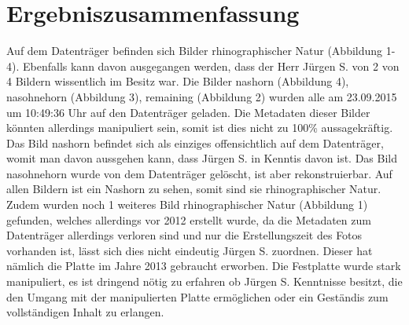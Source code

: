 \chapter{Ergebniszusammenfassung}

Auf dem Datenträger befinden sich Bilder rhinographischer Natur (Abbildung 1- 4). Ebenfalls kann davon ausgegangen werden, dass der Herr Jürgen S. von 2 von 4 Bildern wissentlich im Besitz war. Die Bilder nashorn (Abbildung 4), nasohnehorn (Abbildung 3), remaining (Abbildung 2) wurden alle am 23.09.2015 um 10:49:36 Uhr auf den Datenträger geladen. Die Metadaten dieser Bilder könnten allerdings manipuliert sein, somit ist dies nicht zu 100\% aussagekräftig. Das Bild nashorn befindet sich als einziges offensichtlich auf dem Datenträger, womit man davon aussgehen kann, dass Jürgen S. in Kenntis davon ist. Das Bild nasohnehorn wurde von dem Datenträger gelöscht, ist aber rekonstruierbar. Auf allen Bildern ist ein Nashorn zu sehen, somit sind sie rhinographischer Natur. Zudem wurden noch 1 weiteres Bild rhinographischer Natur (Abbildung 1) gefunden, welches allerdings vor 2012 erstellt wurde, da die Metadaten zum Datenträger allerdings verloren sind und nur die Erstellungszeit des Fotos vorhanden ist, lässt sich dies nicht eindeutig Jürgen S. zuordnen. Dieser hat nämlich die Platte im Jahre 2013 gebraucht erworben. Die Festplatte wurde stark manipuliert, es ist dringend nötig zu erfahren ob Jürgen S. Kenntnisse besitzt, die den Umgang mit der manipulierten Platte ermöglichen oder ein Geständis zum vollständigen Inhalt zu erlangen.